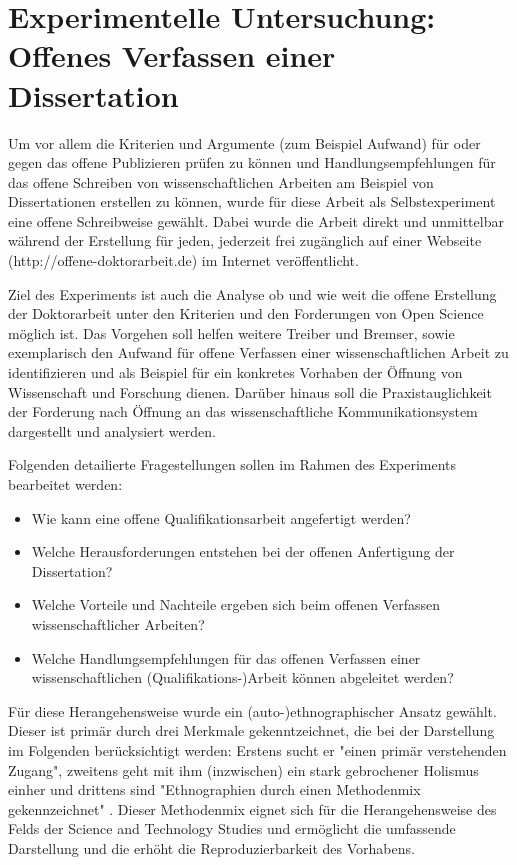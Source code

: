 \chapter{Experimentelle Untersuchung: Offenes Verfassen einer Dissertation}

Um vor allem die Kriterien und Argumente (zum Beispiel Aufwand) für oder gegen das offene Publizieren prüfen zu können und Handlungsempfehlungen für das offene Schreiben von wissenschaftlichen Arbeiten am Beispiel von Dissertationen erstellen zu können, wurde für diese Arbeit als Selbstexperiment eine offene Schreibweise gewählt. Dabei wurde die Arbeit direkt und unmittelbar während der Erstellung für jeden, jederzeit frei zugänglich auf einer Webseite (http://offene-doktorarbeit.de) im Internet veröffentlicht.

Ziel des Experiments ist auch die Analyse ob und wie weit die offene Erstellung der Doktorarbeit unter den Kriterien und den Forderungen von Open Science möglich ist. Das Vorgehen soll helfen weitere Treiber und Bremser, sowie exemplarisch den Aufwand für offene Verfassen einer wissenschaftlichen Arbeit zu identifizieren und als Beispiel für ein konkretes Vorhaben der Öffnung von Wissenschaft und Forschung dienen. Darüber hinaus soll die Praxistauglichkeit der Forderung nach Öffnung an das wissenschaftliche Kommunikationsystem dargestellt und analysiert werden.

Folgenden detailierte Fragestellungen sollen im Rahmen des Experiments bearbeitet werden:
\begin{itemize}
\item Wie kann eine offene Qualifikationsarbeit angefertigt werden?
\item Welche Herausforderungen entstehen bei der offenen Anfertigung der Dissertation?
\item Welche Vorteile und Nachteile ergeben sich beim offenen Verfassen wissenschaftlicher Arbeiten?
\item Welche Handlungsempfehlungen für das offenen Verfassen einer wissenschaftlichen (Qualifikations-)Arbeit können abgeleitet werden?
\end{itemize}

Für diese Herangehensweise wurde ein (auto-)ethnographischer Ansatz gewählt. Dieser ist primär durch drei Merkmale gekenntzeichnet, die bei der Darstellung im Folgenden berücksichtigt werden:  Erstens sucht er  "einen primär verstehenden Zugang", zweitens geht mit ihm (inzwischen) ein stark gebrochener Holismus einher und drittens sind "Ethnographien durch einen Methodenmix gekennzeichnet" \cite{bachmann_2011_ethnographie}. Dieser Methodenmix eignet sich für die Herangehensweise des Felds der Science and Technology Studies und ermöglicht die umfassende Darstellung und die erhöht die Reproduzierbarkeit des Vorhabens.

